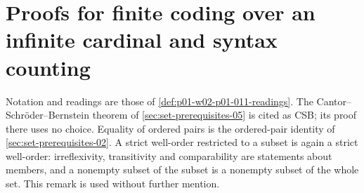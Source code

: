 \section{Proofs for finite coding over an infinite cardinal and syntax counting}
\label{sec:annex-p01-w02-p01-011-finite-coding}

Notation and readings are those of \cref{def:p01-w02-p01-011-readings}. The
Cantor--Schr\"oder--Bernstein theorem of \cref{sec:set-prerequisites-05} is
cited as CSB; its proof there uses no choice. Equality of ordered pairs is
the ordered-pair identity of \cref{sec:set-prerequisites-02}. A strict
well-order restricted to a subset is again a strict well-order:
irreflexivity, transitivity and comparability are statements about members,
and a nonempty subset of the subset is a nonempty subset of the whole set.
This remark is used without further mention.

